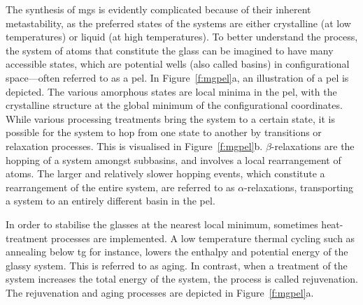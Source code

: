 The synthesis of \gls{mg}s is evidently complicated because of their inherent metastability, as the preferred states of the systems are either crystalline (at low temperatures) or liquid (at high temperatures). To better understand the process, the system of atoms that constitute the glass can be imagined to have many accessible states, which are potential wells (also called basins) in configurational space---often referred to as a \gls{pel}. In Figure~\ref{f:mgpel}a, an illustration of a \gls{pel} is depicted. The various amorphous states are local minima in the \gls{pel}, with the crystalline structure at the global minimum of the configurational coordinates. While various processing treatments bring the system to a certain state, it is possible for the system to hop from one state to another by transitions or relaxation processes. This is visualised in Figure~\ref{f:mgpel}b. $\beta$-relaxations are the hopping of a system amongst subbasins, and involves a local rearrangement of atoms. The larger and relatively slower hopping events, which constitute a rearrangement of the entire system, are referred to as $\alpha$-relaxations, transporting a system to an entirely different basin in the \gls{pel}. \par

In order to stabilise the glasses at the nearest local minimum, sometimes heat-treatment processes are implemented. A low temperature thermal cycling such as annealing below \gls{tg} for instance, lowers the enthalpy and potential energy of the glassy system. This is referred to as aging. In contrast, when a treatment of the system increases the total energy of the system, the process is called rejuvenation. The rejuvenation and aging processes are depicted in Figure~\ref{f:mgpel}a. 

